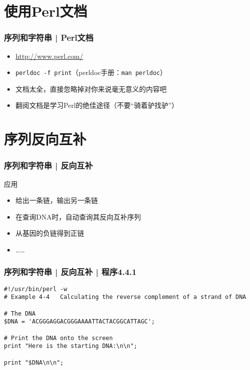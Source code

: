 \section{使用Perl文档}
\begin{frame}[fragile]
  \frametitle{序列和字符串 | \alert{Perl文档}}
  \begin{itemize}
    \item \href{http://www.perl.com/}{http://www.perl.com/} 
    \item \verb|perldoc -f print|（perldoc手册：\verb|man perldoc|）
    \item 文档太全，直接忽略掉对你来说毫无意义的内容吧
    \item 翻阅文档是学习Perl的绝佳途径（不要“骑着驴找驴”）
  \end{itemize}
\end{frame}

\section{序列反向互补}
\begin{frame}
  \frametitle{序列和字符串 | 反向互补}
  \begin{block}{应用}
    \begin{itemize}
      \item 给出一条链，输出另一条链
      \item 在查询DNA时，自动查询其反向互补序列
      \item 从基因的负链得到正链
      \item ……
    \end{itemize}
  \end{block}
\end{frame}

\begin{frame}[fragile]
  \frametitle{序列和字符串 | 反向互补 | 程序4.4.1}
  \vspace{-1.5em}
\begin{lstlisting}
#!/usr/bin/perl -w
# Example 4-4   Calculating the reverse complement of a strand of DNA

# The DNA
$DNA = 'ACGGGAGGACGGGAAAATTACTACGGCATTAGC';

# Print the DNA onto the screen
print "Here is the starting DNA:\n\n";

print "$DNA\n\n";
\end{lstlisting}
\end{frame}

